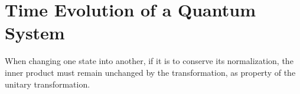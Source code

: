 



\section{Time Evolution of a Quantum System}
When changing one state into another, if it is to conserve its normalization, the inner product must remain unchanged by the transformation, as property of the unitary transformation. 

